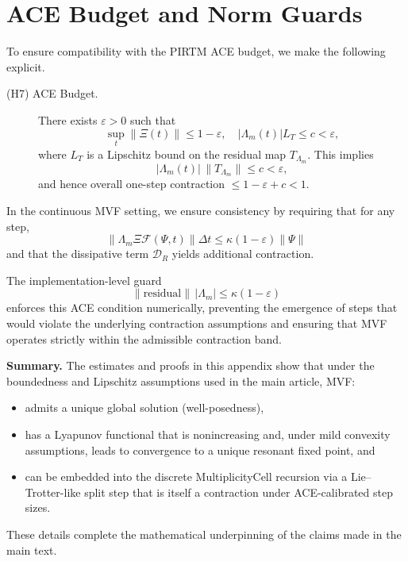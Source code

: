 \documentclass[11pt]{article}
\begin{document}
\section{ACE Budget and Norm Guards}

To ensure compatibility with the PIRTM ACE budget, we make the following explicit.

\begin{description}
  \item[(H7) ACE Budget.] There exists $\varepsilon>0$ such that
        \[
          \sup_t\|\Xi(t)\|\le 1-\varepsilon,
          \quad
          |\Lambda_m(t)|L_T \le c < \varepsilon,
        \]
        where $L_T$ is a Lipschitz bound on the residual map $T_{\Lambda_m}$. This implies
        \[
          |\Lambda_m(t)|\,\|T_{\Lambda_m}\| \le c < \varepsilon,
        \]
        and hence overall one-step contraction $\le 1-\varepsilon+c < 1$.
\end{description}

In the continuous MVF setting, we ensure consistency by requiring that for any step,
\[
  \|\Lambda_m \Xi \mathcal{F}(\Psi,t)\|\Delta t
  \le \kappa (1-\varepsilon)\|\Psi\|
\]
and that the dissipative term $\mathcal{D}_R$ yields additional contraction.

The implementation-level guard
\[
  \|\text{residual}\|\,|\Lambda_m| \le \kappa (1-\varepsilon)
\]
enforces this ACE condition numerically, preventing the emergence of steps that would violate the underlying contraction assumptions and ensuring that MVF operates strictly within the admissible contraction band.

\bigskip

\noindent
\textbf{Summary.} The estimates and proofs in this appendix show that under the boundedness and Lipschitz assumptions used in the main article, MVF:
\begin{itemize}
  \item admits a unique global solution (well-posedness),
  \item has a Lyapunov functional that is nonincreasing and, under mild convexity assumptions, leads to convergence to a unique resonant fixed point, and
  \item can be embedded into the discrete MultiplicityCell recursion via a Lie--Trotter-like split step that is itself a contraction under ACE-calibrated step sizes.
\end{itemize}
These details complete the mathematical underpinning of the claims made in the main text.

\nocite{*}
  
  
\end{document}
